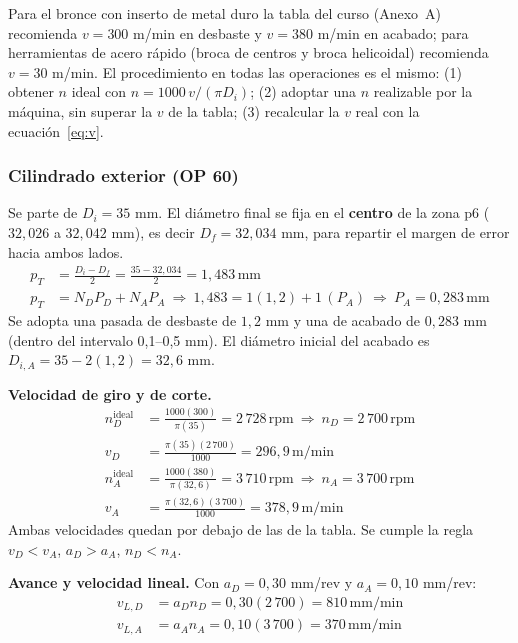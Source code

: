 \documentclass[12pt,a4paper]{article}
\newcommand{\umm}{\,\mathrm{mm}}
\newcommand{\urpm}{\,\mathrm{rpm}}
\newcommand{\umpm}{\,\mathrm{m/min}}
\newcommand{\ummmin}{\,\mathrm{mm/min}}
\begin{document}
Para el bronce con inserto de metal duro la tabla del curso (Anexo~A) recomienda
$v=300$ m/min en desbaste y $v=380$ m/min en acabado; para herramientas de acero
rápido (broca de centros y broca helicoidal) recomienda $v=30$ m/min. El
procedimiento en todas las operaciones es el mismo: (1) obtener $n$ ideal con
$n=1000\,v/(\pi D_i)$; (2) adoptar una $n$ realizable por la máquina, sin superar
la $v$ de la tabla; (3) recalcular la $v$ real con la ecuación~\eqref{eq:v}.

\subsubsection{Cilindrado exterior (OP 60)}

Se parte de $D_i=35$ mm. El diámetro final se fija en el \textbf{centro} de la
zona p6 ($32{,}026$ a $32{,}042$ mm), es decir $D_f=32{,}034$ mm, para repartir
el margen de error hacia ambos lados.
\begin{align*}
	p_T & = \frac{D_i-D_f}{2}=\frac{35-32{,}034}{2}=1{,}483\umm                                   \\
	p_T & = N_DP_D+N_AP_A\ \Rightarrow\ 1{,}483 = 1(1{,}2)+1\,(P_A)\ \Rightarrow\ P_A=0{,}283\umm
\end{align*}
Se adopta una pasada de desbaste de $1{,}2$ mm y una de acabado de $0{,}283$ mm
(dentro del intervalo 0,1--0,5 mm). El diámetro inicial del acabado es
$D_{i,A}=35-2(1{,}2)=32{,}6$ mm.

\textbf{Velocidad de giro y de corte.}
\begin{align*}
	n_D^{\text{ideal}} & =\frac{1000(300)}{\pi(35)}=2\,728\urpm\ \Rightarrow\ n_D=2\,700\urpm     \\
	v_D                & =\frac{\pi(35)(2\,700)}{1000}=296{,}9\umpm                               \\
	n_A^{\text{ideal}} & =\frac{1000(380)}{\pi(32{,}6)}=3\,710\urpm\ \Rightarrow\ n_A=3\,700\urpm \\
	v_A                & =\frac{\pi(32{,}6)(3\,700)}{1000}=378{,}9\umpm
\end{align*}
Ambas velocidades quedan por debajo de las de la tabla. Se cumple la regla
$v_D<v_A$, $a_D>a_A$, $n_D<n_A$.

\textbf{Avance y velocidad lineal.} Con $a_D=0{,}30$ mm/rev y $a_A=0{,}10$ mm/rev:
\begin{align*}
	v_{L,D} & =a_Dn_D=0{,}30(2\,700)=810\ummmin \\
	v_{L,A} & =a_An_A=0{,}10(3\,700)=370\ummmin
\end{align*}
\end{document}
